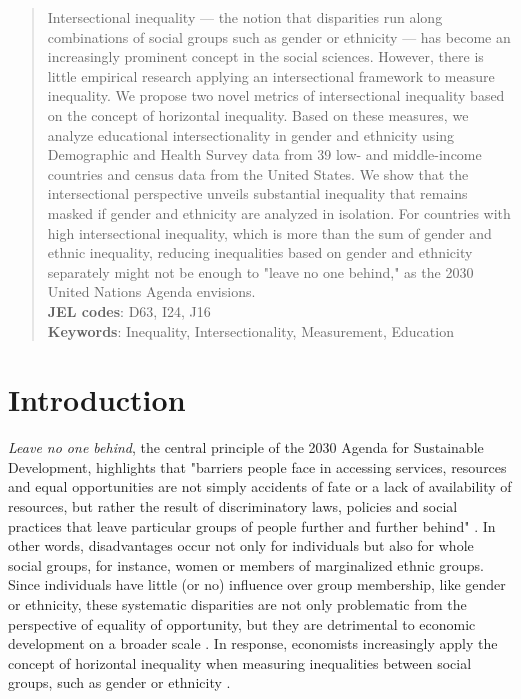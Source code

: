 \begin{abstract}
  \noindent Intersectional inequality --- the notion that disparities run along combinations of social groups such as gender or ethnicity --- has become an increasingly prominent concept in the social sciences. However, there is little empirical research applying an intersectional framework to measure inequality. We propose two novel metrics of intersectional inequality based on the concept of horizontal inequality. Based on these measures, we analyze educational intersectionality in gender and ethnicity using Demographic and Health Survey data from 39 low- and middle-income countries and census data from the United States. We show that the intersectional perspective unveils substantial inequality that remains masked if gender and ethnicity are analyzed in isolation. For countries with high intersectional inequality, which is more than the sum of gender and ethnic inequality, reducing inequalities based on gender and ethnicity separately might not be enough to "leave no one behind," as the 2030 United Nations Agenda envisions.  \\
  
  \noindent \textbf{JEL codes}: D63, I24, J16  \\
    
  \noindent \textbf{Keywords}: Inequality, Intersectionality, Measurement, Education 
  \end{abstract}
\restoregeometry

\onehalfspacing
\hypertarget{introduction}{%
\section{Introduction}\label{introduction}}

\textit{Leave no one behind}, the central principle of the 2030 Agenda for Sustainable Development, highlights that "barriers people face in accessing services, resources and equal opportunities are not simply accidents of fate or a lack of availability of resources, but rather the result of discriminatory laws, policies and social practices that leave particular groups of people further and further behind" \citep{UNSDG2022}. In other words, disadvantages occur not only for individuals but also for whole social groups, for instance, women or members of marginalized ethnic groups. Since individuals have little (or no) influence over group membership, like gender or ethnicity, these systematic disparities are not only problematic from the perspective of equality of opportunity, but they are detrimental to economic development on a broader scale \citep{Ferreira2018, Marrero2013}. In response, economists increasingly apply the concept of horizontal inequality when measuring inequalities between social groups, such as gender or ethnicity \citep{Mancini2008}. 

